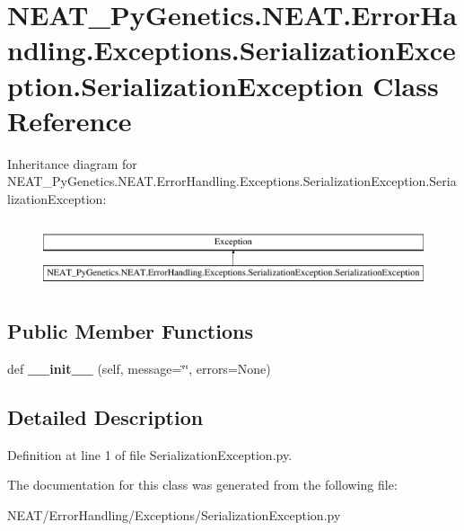 \hypertarget{class_n_e_a_t___py_genetics_1_1_n_e_a_t_1_1_error_handling_1_1_exceptions_1_1_serialization_exced8c283cc206751d1c7b7fc1791f39a64}{}\section{N\+E\+A\+T\+\_\+\+Py\+Genetics.\+N\+E\+A\+T.\+Error\+Handling.\+Exceptions.\+Serialization\+Exception.\+Serialization\+Exception Class Reference}
\label{class_n_e_a_t___py_genetics_1_1_n_e_a_t_1_1_error_handling_1_1_exceptions_1_1_serialization_exced8c283cc206751d1c7b7fc1791f39a64}
Inheritance diagram for N\+E\+A\+T\+\_\+\+Py\+Genetics.\+N\+E\+A\+T.\+Error\+Handling.\+Exceptions.\+Serialization\+Exception.\+Serialization\+Exception\+:\begin{figure}[H]
\begin{center}
\leavevmode
\includegraphics[height=1.978799cm]{class_n_e_a_t___py_genetics_1_1_n_e_a_t_1_1_error_handling_1_1_exceptions_1_1_serialization_exced8c283cc206751d1c7b7fc1791f39a64}
\end{center}
\end{figure}
\subsection*{Public Member Functions}
\begin{DoxyCompactItemize}
\item 
def {\bfseries \+\_\+\+\_\+init\+\_\+\+\_\+} (self, message=\char`\"{}\char`\"{}, errors=None)\hypertarget{class_n_e_a_t___py_genetics_1_1_n_e_a_t_1_1_error_handling_1_1_exceptions_1_1_serialization_exced8c283cc206751d1c7b7fc1791f39a64_ada817ecebb49fc5dc085531462eef9a0}{}\label{class_n_e_a_t___py_genetics_1_1_n_e_a_t_1_1_error_handling_1_1_exceptions_1_1_serialization_exced8c283cc206751d1c7b7fc1791f39a64_ada817ecebb49fc5dc085531462eef9a0}

\end{DoxyCompactItemize}


\subsection{Detailed Description}


Definition at line 1 of file Serialization\+Exception.\+py.



The documentation for this class was generated from the following file\+:\begin{DoxyCompactItemize}
\item 
N\+E\+A\+T/\+Error\+Handling/\+Exceptions/Serialization\+Exception.\+py\end{DoxyCompactItemize}
